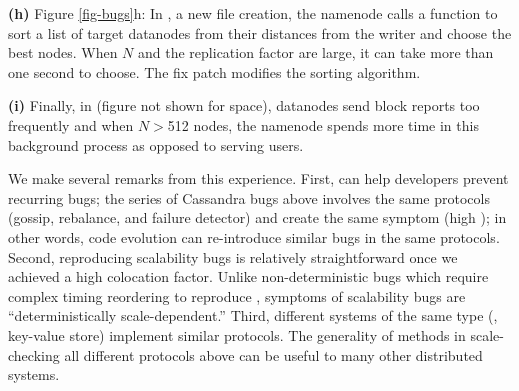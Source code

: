 {\bf (h)} Figure \ref{fig-bugs}h: In \hdtri \cite{HDFS-Tri}, a new file creation, the
namenode calls a  function to sort a list of target
datanodes from their distances from the writer and choose the best nodes.
When $N$ and the replication factor are large, it can take more than one
second to choose.  The fix patch modifies the sorting algorithm.


{\bf (i)} Finally, in \hdfour \cite{HDFS-Four} (figure not shown for space),
datanodes send block reports too frequently and when $N$$>$512 nodes, the
namenode spends more time in this background process as opposed to serving
users.

We make several remarks from this experience.
%
First, \sck can help developers prevent recurring bugs; the series of
Cassandra bugs above involves the same protocols (gossip, rebalance, and
failure detector) and create the same symptom (high \flaps); in other
words, code evolution can re-introduce similar bugs in the same protocols.
%
Second, reproducing scalability bugs is relatively straightforward once we
achieved a high colocation factor.  Unlike non-deterministic bugs which
require complex timing reordering to reproduce \cite{Guo+11-Demeter,
Leesatapornwongsa+14-Samc},
symptoms of scalability bugs are ``deterministically scale-dependent.''
%
%
Third, different systems of the same type (\eg, key-value store) implement
similar protocols.  The  generality of \sck methods in scale-checking
all different protocols above can be useful to many other distributed systems.
%

